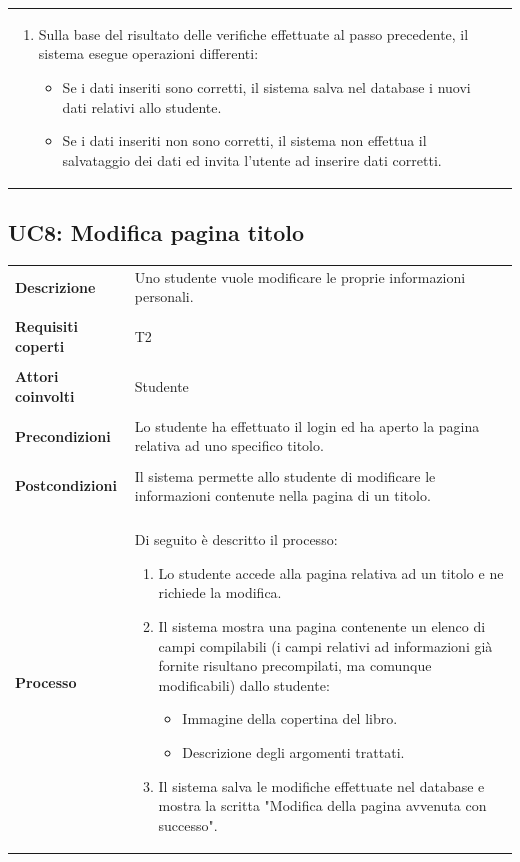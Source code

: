 \documentclass[10pt,a4paper]{report}
\begin{document}
\begin{tabular}{lp{}}
\begin{enumerate}
			\item Sulla base del risultato delle verifiche effettuate al passo precedente, il sistema esegue operazioni differenti:
			\begin{itemize}
				\item Se i dati inseriti sono corretti, il sistema salva nel database i nuovi dati relativi allo studente.
				\item Se i dati inseriti non sono corretti, il sistema non effettua il salvataggio dei dati ed invita l'utente ad inserire dati corretti.
			\end{itemize}
		\end{enumerate}
	\end{tabular}

	\subsection{UC8: Modifica pagina titolo}
	\begin{tabular}{lp{}}
		\textbf{Descrizione}&Uno studente vuole modificare le proprie informazioni personali.\\
		\\
		\textbf{Requisiti coperti}&T2\\
		\\
		\textbf{Attori coinvolti}&Studente\\
		\\
		\textbf{Precondizioni}&Lo studente ha effettuato il login ed ha aperto la pagina relativa ad uno specifico titolo.\\
		\\
		\textbf{Postcondizioni}&Il sistema permette allo studente di modificare le informazioni contenute nella pagina di un titolo.\\
		\\
		\textbf{Processo}&Di seguito è descritto il processo:
		\begin{enumerate}
			\item Lo studente accede alla pagina relativa ad un titolo e ne richiede la modifica.
			\item Il sistema mostra una pagina contenente un elenco di campi compilabili (i campi relativi ad informazioni già fornite risultano precompilati, ma comunque modificabili) dallo studente:
			\begin{itemize}
				\item Immagine della copertina del libro.
				\item Descrizione degli argomenti trattati.
			\end{itemize}
			\item Il sistema salva le modifiche effettuate nel database e mostra la scritta "Modifica della pagina avvenuta con successo".
		\end{enumerate}
	\end{tabular}
\end{document}
